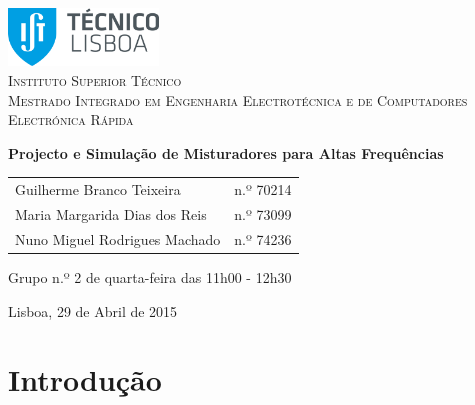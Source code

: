 \documentclass[11pt]{article}
\numberwithin{equation}{section}
\begin{document}
\begin{titlepage}
\begin{center}

\hfill \break
\hfill \break

\includegraphics[width=0.3\textwidth]{./logo}~\\[1cm] 

\textsc{\LARGE Instituto Superior Técnico}\\[0.25cm]
\textsc{\Large Mestrado Integrado em Engenharia Electrotécnica e de Computadores}\\[1.8cm]
\textsc{\huge Electrónica Rápida}\\[0.25cm]

\vspace{6mm}

{\huge \bfseries Projecto e Simulação de Misturadores para Altas Frequências\\[1cm]}

\begin{tabular}{ l l }
Guilherme Branco Teixeira & \hspace{2mm} n.º 70214 \\
Maria Margarida Dias dos Reis & \hspace{2mm} n.º 73099 \\
Nuno Miguel Rodrigues Machado & \hspace{2mm} n.º 74236
\end{tabular}

\vspace{7mm}

Grupo n.º 2 de quarta-feira das 11h00 - 12h30

\vfill

{\large Lisboa, 29 de Abril de 2015} 

\end{center}
\end{titlepage}

\clearpage

\tableofcontents
\pagebreak

\clearpage
{}

\section{Introdução}
\end{document}
